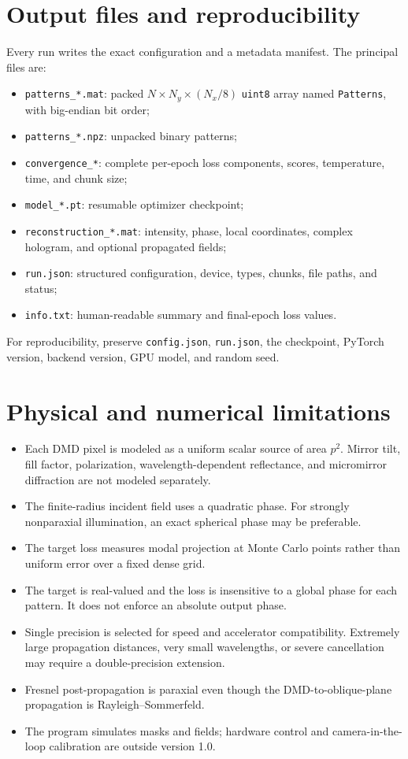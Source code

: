 \documentclass[11pt,a4paper]{article}
\begin{document}
\section{Output files and reproducibility}
Every run writes the exact configuration and a metadata manifest. The principal files are:
\begin{itemize}
  \item \texttt{patterns\_*.mat}: packed $N\times N_y\times(N_x/8)$ \texttt{uint8} array named \texttt{Patterns}, with big-endian bit order;
  \item \texttt{patterns\_*.npz}: unpacked binary patterns;
  \item \texttt{convergence\_*}: complete per-epoch loss components, scores, temperature, time, and chunk size;
  \item \texttt{model\_*.pt}: resumable optimizer checkpoint;
  \item \texttt{reconstruction\_*.mat}: intensity, phase, local coordinates, complex hologram, and optional propagated fields;
  \item \texttt{run.json}: structured configuration, device, types, chunks, file paths, and status;
  \item \texttt{info.txt}: human-readable summary and final-epoch loss values.
\end{itemize}
For reproducibility, preserve \texttt{config.json}, \texttt{run.json}, the checkpoint, PyTorch version, backend version, GPU model, and random seed.

\section{Physical and numerical limitations}
\begin{itemize}
  \item Each DMD pixel is modeled as a uniform scalar source of area $p^2$. Mirror tilt, fill factor, polarization, wavelength-dependent reflectance, and micromirror diffraction are not modeled separately.
  \item The finite-radius incident field uses a quadratic phase. For strongly nonparaxial illumination, an exact spherical phase may be preferable.
  \item The target loss measures modal projection at Monte Carlo points rather than uniform error over a fixed dense grid.
  \item The target is real-valued and the loss is insensitive to a global phase for each pattern. It does not enforce an absolute output phase.
  \item Single precision is selected for speed and accelerator compatibility. Extremely large propagation distances, very small wavelengths, or severe cancellation may require a double-precision extension.
  \item Fresnel post-propagation is paraxial even though the DMD-to-oblique-plane propagation is Rayleigh--Sommerfeld.
  \item The program simulates masks and fields; hardware control and camera-in-the-loop calibration are outside version 1.0.
\end{itemize}
\end{document}
